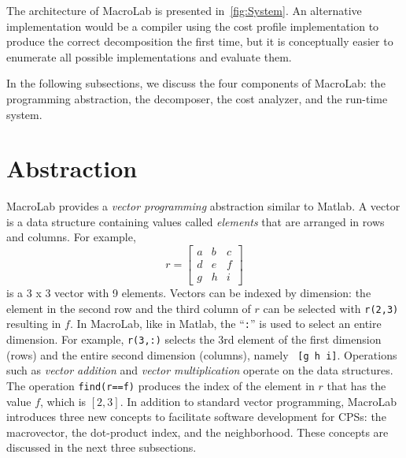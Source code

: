 
The architecture of MacroLab is presented in~\ref{fig:System}. An alternative
implementation would be a compiler using the cost profile implementation to
produce the correct decomposition the first time, but it is conceptually easier
to enumerate all possible implementations and evaluate them. 

In the following subsections, we discuss the four components of MacroLab: the
programming abstraction, the decomposer, the cost analyzer, and the run-time
system.

\section{Abstraction} \label{sect:abstraction}

MacroLab provides a {\em vector programming} abstraction similar to Matlab. A
vector is a data structure containing values called {\em elements}
that are arranged in rows and columns.  For example,
\[ r = \left[ \begin{array}{ccc}
a & b & c \\ d & e & f \\ g & h & i \end{array} \right]\] is a 3 x 3 vector with
9 elements.  Vectors can be indexed by dimension: the element in the second row
and the third column of $r$ can be selected with {\tt r(2,3)} resulting in $f$.
In MacroLab, like in Matlab, the ``{\tt :}'' is used to select an entire
dimension.  For example, {\tt r(3,:)} selects the 3rd element of the first
dimension (rows) and the entire second dimension (columns), namely {\tt
  [g~h~i]}.  Operations such as {\em vector addition} and {\em vector
  multiplication} operate on the data structures. The operation {\tt find(r==f)}
produces the index of the element in $r$ that has the value $f$, which is
$[2,3]$.  In addition to standard vector programming, MacroLab introduces three
new concepts to facilitate software development for CPSs: the macrovector, the
dot-product index, and the neighborhood.  These concepts are discussed in the
next three subsections.


